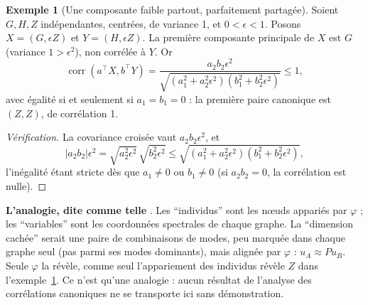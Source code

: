 \documentclass[11pt,a4paper]{article}
\theoremstyle{definition}
\newtheorem{exemple}[definition]{Exemple}
\theoremstyle{plain}
\begin{document}
\begin{exemple}[Une composante faible partout, parfaitement partagée]
\label{ex:cca}
Soient $G,H,Z$ indépendantes, centrées, de variance 1, et $0<\epsilon<1$. Posons $X=(G,\epsilon Z)$ et
$Y=(H,\epsilon Z)$. La première composante principale de $X$ est $G$ (variance $1>\epsilon^2$), non
corrélée à $Y$. Or
\[ \operatorname{corr}(a^\top X,b^\top Y)=\frac{a_2b_2\epsilon^2}{\sqrt{(a_1^2+a_2^2\epsilon^2)(b_1^2+b_2^2\epsilon^2)}}\le1, \]
avec égalité si et seulement si $a_1=b_1=0$ : la première paire canonique est $(Z,Z)$, de
corrélation 1.
\end{exemple}
\begin{proof}[Vérification]
La covariance croisée vaut $a_2b_2\epsilon^2$, et
\[ |a_2b_2|\epsilon^2=\sqrt{a_2^2\epsilon^2}\,\sqrt{b_2^2\epsilon^2}\le\sqrt{(a_1^2+a_2^2\epsilon^2)(b_1^2+b_2^2\epsilon^2)}, \]
l'inégalité étant stricte dès que $a_1\neq0$ ou $b_1\neq0$ (si $a_2b_2=0$, la corrélation est nulle).
\end{proof}

\textbf{L'analogie, dite comme telle} \cite[correction (4)]{complement89}. Les \enquote{individus} sont
les nœuds appariés par $\varphi$ ; les \enquote{variables} sont les coordonnées spectrales de chaque
graphe. La \enquote{dimension cachée} serait une paire de combinaisons de modes, peu marquée dans
chaque graphe seul (pas parmi ses modes dominants), mais alignée par $\varphi$ :
$u_A\approx Pu_B$. Seule $\varphi$ la révèle, comme seul l'appariement des individus révèle $Z$ dans
l'exemple~\ref{ex:cca}. Ce n'est qu'une analogie : aucun résultat de l'analyse des corrélations
canoniques ne se transporte ici sans démonstration.
\end{document}
